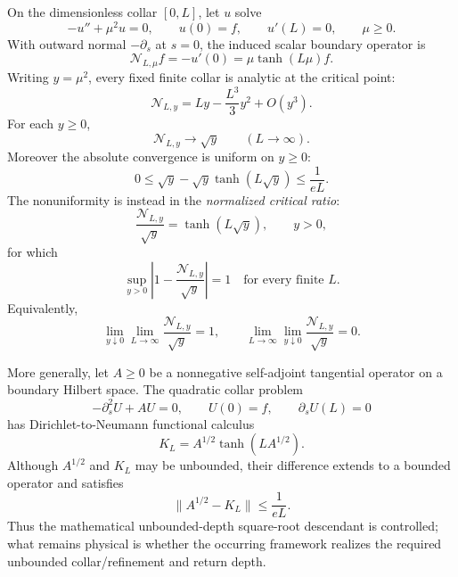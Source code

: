 \documentclass[12pt,a4paper]{article}
\begin{document}
\begin{theorem}
\label{p8:thm:v167-finite-collar-dtn}
On the dimensionless collar \([0,L]\), let \(u\) solve
\[
 -u''+\mu^2u=0,
 \qquad u(0)=f,
 \qquad u'(L)=0,
 \qquad \mu\ge0.
\]
With outward normal \(-\partial_s\) at \(s=0\), the induced scalar boundary
operator is
\begin{equation}
 \label{p8:eq:v167-finite-collar-dtn}
 \boxed{\mathcal N_{L,\mu}f=-u'(0)=\mu\tanh(L\mu)f.}
\end{equation}
Writing \(y=\mu^2\), every fixed finite collar is analytic at the critical
point:
\[
 \mathcal N_{L,y}=Ly-\frac{L^3}{3}y^2+O(y^3).
\]
For each \(y\ge0\),
\[
 \mathcal N_{L,y}\longrightarrow\sqrt y
 \qquad(L\to\infty).
\]
Moreover the absolute convergence is uniform on \(y\ge0\):
\begin{equation}
 \label{p8:eq:v260-finite-collar-uniform-error}
 \boxed{
 0\le \sqrt y-\sqrt y\tanh(L\sqrt y)\le\frac{1}{eL}.}
\end{equation}
The nonuniformity is instead in the \emph{normalized critical ratio}:
\[
 \frac{\mathcal N_{L,y}}{\sqrt y}=\tanh(L\sqrt y),\qquad y>0,
\]
for which
\begin{equation}
 \label{p8:eq:v260-relative-critical-nonuniformity}
 \boxed{
 \sup_{y>0}\left|1-\frac{\mathcal N_{L,y}}{\sqrt y}\right|=1
 \quad\text{for every finite }L.}
\end{equation}
Equivalently,
\[
 \lim_{y\downarrow0}\lim_{L\to\infty}
 \frac{\mathcal N_{L,y}}{\sqrt y}=1,
 \qquad
 \lim_{L\to\infty}\lim_{y\downarrow0}
 \frac{\mathcal N_{L,y}}{\sqrt y}=0.
\]

More generally, let \(A\ge0\) be a nonnegative self-adjoint tangential
operator on a boundary Hilbert space.  The quadratic collar problem
\[
 -\partial_s^2U+AU=0,
 \qquad U(0)=f,
 \qquad \partial_sU(L)=0
\]
has Dirichlet-to-Neumann functional calculus
\begin{equation}
 \label{p8:eq:v260-operator-finite-collar-dtn}
 \boxed{K_L=A^{1/2}\tanh(LA^{1/2}).}
\end{equation}
Although \(A^{1/2}\) and \(K_L\) may be unbounded, their difference extends
to a bounded operator and satisfies
\begin{equation}
 \label{p8:eq:v260-operator-uniform-error}
 \boxed{\|A^{1/2}-K_L\|\le\frac1{eL}.}
\end{equation}
Thus the mathematical unbounded-depth square-root descendant is controlled;
what remains physical is whether the occurring framework realizes the
required unbounded collar/refinement and return depth.
\end{theorem}
\end{document}
